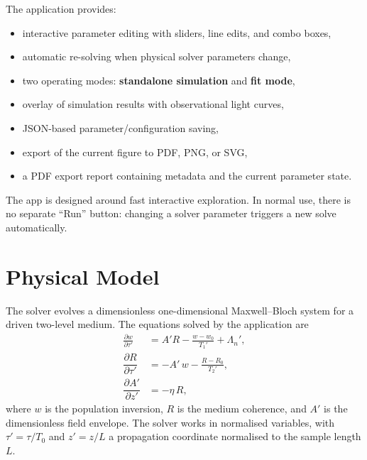 \documentclass[12pt,a4paper]{article}
\newcommand{\T}{T_0}
\newcommand{\pderiv}[2]{\dfrac{\partial #1}{\partial #2}}
\begin{document}
The application provides:
\begin{itemize}[noitemsep]
  \item interactive parameter editing with sliders, line edits, and combo boxes,
  \item automatic re-solving when physical solver parameters change,
  \item two operating modes: \textbf{standalone simulation} and \textbf{fit mode},
  \item overlay of simulation results with observational light curves,
  \item JSON-based parameter/configuration saving,
  \item export of the current figure to PDF, PNG, or SVG,
  \item a PDF export report containing metadata and the current parameter state.
\end{itemize}

\begin{notebox}
The app is designed around fast interactive exploration. In normal use, there is no separate
``Run'' button: changing a solver parameter triggers a new solve automatically.
\end{notebox}

\section{Physical Model}
\label{sec:model}

The solver evolves a dimensionless one-dimensional Maxwell--Bloch system
for a driven two-level medium. The equations solved by the application are
\begin{align}
  \frac{\partial w}{\partial \tau'}
    &= A'R - \frac{w - w_0}{T_1'} + \Lambda_n',
  \label{eq:realw}\\[8pt]
  \pderiv{R}{\tau'}
    &= -A'\,w - \frac{R - R_0}{T_2'},
  \label{eq:realR}\\[8pt]
  \pderiv{A'}{z'}
    &= -\eta\, R,
  \label{eq:realA}
\end{align}
where $w$ is the population inversion, $R$ is the medium coherence, and
$A'$ is the dimensionless field envelope. The solver works in normalised
variables, with $\tau' = \tau/\T$ and $z' = z/L$ a propagation coordinate
normalised to the sample length $L$.
\end{document}
